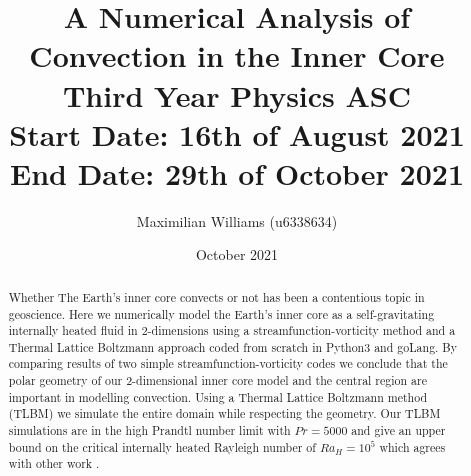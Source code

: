 \documentclass{article}
\title{%
  A Numerical Analysis of Convection in the Inner Core \\
  \large Third Year Physics ASC  \\
    Start Date: 16th of August 2021 End Date: 29th of October 2021}
\author{Maximilian Williams (u6338634)}
\date{October 2021}
\begin{document}
\maketitle

\begin{abstract}

	\noindent Whether The Earth's inner core convects or not has been a contentious topic 
	in geoscience. Here we numerically model the Earth's inner core as a self-gravitating 
	internally heated fluid 
	in 2-dimensions using a streamfunction-vorticity method and a Thermal Lattice Boltzmann 
	approach coded from scratch in Python3 and goLang. By 
	comparing results of two simple 
	streamfunction-vorticity codes we conclude that the polar geometry of our 2-dimensional
	inner core model and the central region are important in 
	modelling convection. Using a Thermal Lattice Boltzmann method (TLBM) we simulate the 
	entire domain while respecting the geometry. Our TLBM simulations are in the high 
	Prandtl number limit with $Pr=5000$ and give an upper bound on the critical internally 
	heated Rayleigh number of $Ra_H = 10^5$ which agrees with other work \cite{babskii1971convection}. 
 
\end{abstract}
\end{document}
